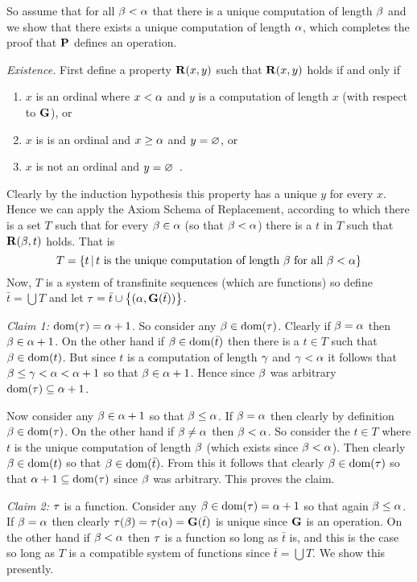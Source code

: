 \begin{questions}
\begin{solution}
    So assume that for all $\b < \a$ that there is a unique computation of length $\b$ and we show that there exists a unique computation of length $\a$, which completes the proof that $\P$ defines an operation.

    \emph{Existence.} First define a property $\R(x,y)$ such that $\R(x,y)$ holds if and only if
    \begin{enumerate}
        \item $x$ is an ordinal where $x < \a$ and $y$ is a computation of length $x$ (with respect to $\G$), or
        \item $x$ is is an ordinal and $x \geq \a$ and $y = \es$, or
        \item $x$ is not an ordinal and $y = \es$ \,.
    \end{enumerate}
    Clearly by the induction hypothesis this property has a unique $y$ for every $x$.
    Hence we can apply the Axiom Schema of Replacement, according to which there is a set $T$ such that for every $\b \in \a$ (so that $\b < \a$) there is a $t$ in $T$ such that $\R(\b, t)$ holds.
    That is
    $$
    T = \braces{t \where t \text{ is the unique computation of length $\b$ for all $\b < \a$}}
    $$
    Now, $T$ is a system of transfinite sequences (which are functions) so define $\bar{t} = \bigcup T$ and let $\t = \bar{t} \cup \braces{(\a, \G(\bar{t}))}$.

    \emph{Claim 1:} $\dom(\t) = \a+1$.
    So consider any $\b \in \dom(\t)$.
    Clearly if $\b = \a$ then $\b \in \a+1$.
    On the other hand if $\b \in \dom(\bar{t})$ then there is a $t \in T$ such that $\b \in \dom(t)$.
    But since $t$ is a computation of length $\g$ and $\g < \a$ it follows that $\b \leq \g < \a < \a+1$ so that $\b \in \a+1$.
    Hence since $\b$ was arbitrary $\dom(\t) \ss \a+1$.

    Now consider any $\b \in \a+1$ so that $\b \leq \a$.
    If $\b = \a$ then clearly by definition $\b \in \dom(\t)$.
    On the other hand if $\b \neq \a$ then $\b < \a$.
    So consider the $t \in T$ where $t$ is the unique computation of length $\b$ (which exists since $\b < \a$).
    Then clearly $\b \in \dom(t)$ so that $\b \in \dom(\bar{t})$.
    From this it follows that clearly $\b \in \dom(\t)$ so that $\a+1 \ss \dom(\t)$ since $\b$ was arbitrary.
    This proves the claim.
    
    \emph{Claim 2:} $\t$ is a function.
    Consider any $\b \in \dom(\t) = \a+1$ so that again $\b \leq \a$.
    If $\b = \a$ then clearly $\t(\b) = \t(\a) = \G(\bar{t})$ is unique since $\G$ is an operation.
    On the other hand if $\b < \a$ then $\t$ is a function so long as $\bar{t}$ is, and this is the case so long as $T$ is a compatible system of functions since $\bar{t} = \bigcup T$.
    We show this presently.


\end{solution}
\end{questions}
